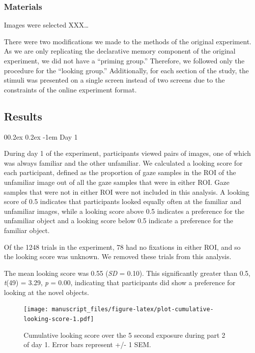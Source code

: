 \documentclass[
  man,floatsintext]{apa6}
\makeatletter
\let\oldparagraph\paragraph
\renewcommand{\paragraph}[1]{\oldparagraph{#1}\mbox{}}
\renewcommand{\paragraph}{\@startsection{paragraph}{4}{\parindent}%
  {0\baselineskip \@plus 0.2ex \@minus 0.2ex}%
  {-1em}%
  {\normalfont\normalsize\bfseries\itshape\typesectitle}}
\makeatother
\begin{document}
\hypertarget{materials}{%
\subsubsection{Materials}\label{materials}}

Images were selected XXX\ldots{}

There were two modifications we made to the methods of the original
experiment. As we are only replicating the declarative memory component
of the original experiment, we did not have a ``priming group.''
Therefore, we followed only the procedure for the ``looking group.''
Additionally, for each section of the study, the stimuli was presented
on a single screen instead of two screens due to the constraints of the
online experiment format.

\hypertarget{results-2}{%
\subsection{Results}\label{results-2}}

\hypertarget{day-1}{%
\paragraph{Day 1}\label{day-1}}

During day 1 of the experiment, participants viewed pairs of images, one of which was always familiar and the other unfamiliar. We calculated a looking score for each participant, defined as the proportion of gaze samples in the ROI of the unfamiliar image out of all the gaze samples that were in either ROI. Gaze samples that were not in either ROI were not included in this analysis. A looking score of 0.5 indicates that participants looked equally often at the familiar and unfamiliar images, while a looking score above 0.5 indicates a preference for the unfamiliar object and a looking score below 0.5 indicate a preference for the familiar object.

Of the 1248 trials in the experiment, 78 had no fixations in either ROI, and so the looking score was unknown. We removed these trials from this analysis.

The mean looking score was 0.55 (\emph{SD} = 0.10). This significantly greater than 0.5, \emph{t}(49) = 3.29, \emph{p} = 0.00, indicating that participants did show a preference for looking at the novel objects.

\begin{figure}
\centering
\texttt{[image: manuscript\_files/figure-latex/plot-cumulative-looking-score-1.pdf]}
\caption{\label{fig:plot-cumulative-looking-score}Cumulative looking score over the 5 second exposure during part 2 of day 1. Error bars represent +/- 1 SEM.}
\end{figure}
\end{document}
